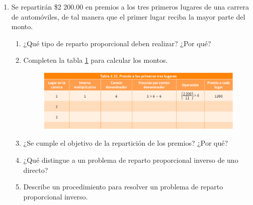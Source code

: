 \documentclass[11pt]{book}
\begin{document}
\begin{enumerate}
  \item Se repartirán \$2 200.00 en premios a los tres primeros lugares de una carrera de automóviles, de tal manera que el primer lugar reciba la mayor parte del monto.
        \begin{enumerate}
          \item ¿Qué tipo de reparto proporcional deben realizar? ¿Por qué?
          \item  Completen la tabla \ref{tab:reparto_carrera} para calcular los montos.
                \begin{figure}[H]
                  \centering
                  \includegraphics[width=\textwidth]{reparto_carrera}
                  \label{tab:reparto_carrera}
                \end{figure}
          \item ¿Se cumple el objetivo de la repartición de los premios? ¿Por qué?
          \item ¿Qué distingue a un problema de reparto proporcional inverso de uno directo?
          \item Describe un procedimiento para resolver un problema de reparto proporcional inverso.
        \end{enumerate}

\end{enumerate}



\newpage
\end{document}
